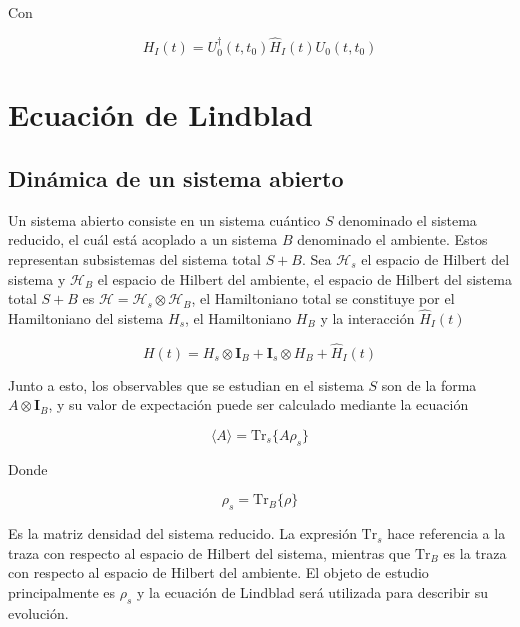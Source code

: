 Con 

\begin{equation*}
    H_{I}(t) = U^{\dagger}_{0}(t,t_{0})\hat{H}_{I}(t)U_{0}(t,t_{0})
\end{equation*}

\label{sec:closedQM}



\section{Ecuación de Lindblad}

\subsection{Dinámica de un sistema abierto}

Un sistema abierto consiste en un sistema cuántico $S$ denominado el sistema reducido, el cuál está acoplado a un sistema $B$ denominado el ambiente. Estos representan  subsistemas del sistema total $S+B$. Sea $\mathcal{H}_{s}$ el espacio de Hilbert del sistema y $\mathcal{H}_{B}$ el espacio de Hilbert del ambiente, el espacio de Hilbert del sistema total $S+B$ es  $\mathcal{H} = \mathcal{H}_{s} \otimes \mathcal{H}_{B}$, el Hamiltoniano total se constituye por el Hamiltoniano del sistema $H_{s}$, el Hamiltoniano $H_{B}$ y la interacción $\hat{H}_{I}(t)$

\begin{equation*}
    H(t) = H_{s} \otimes \mathbf{I}_{B} + \mathbf{I}_{s} \otimes H_{B} + \hat{H}_{I}(t)
\end{equation*}

Junto a esto,  los observables que se estudian en el sistema $S$ son de la forma $A\otimes \mathbf{I}_{B}$, y su valor de expectación puede ser calculado mediante la ecuación

\begin{equation*}
    \langle A \rangle = \text{Tr}_{s}\{A \rho_{s} \}
\end{equation*}

Donde 

\begin{equation*}
    \rho_{s} = \text{Tr}_{B}\{ \rho \}
\end{equation*}

Es la matriz densidad del sistema reducido. La expresión $\text{Tr}_{s}$ hace referencia a la traza con respecto al espacio de Hilbert del sistema, mientras que $\text{Tr}_{B}$  
es la traza con respecto al espacio de Hilbert del ambiente. El objeto de estudio principalmente es $\rho_{s}$ y la ecuación de Lindblad será utilizada para describir su evolución.

